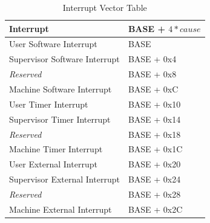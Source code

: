 \documentclass[12pt]{article}
\begin{document}
\begin{table}
\centering
\begin{tabular}{| l | l |}
\hline
Interrupt & BASE + $4*cause$ \\
\hline
User Software Interrupt & BASE \\
\hline
Supervisor Software Interrupt & BASE + 0x4 \\
\hline
\emph{Reserved} & BASE + 0x8 \\ 
\hline
Machine Software Interrupt & BASE + 0xC \\ 
\hline
User Timer Interrupt & BASE + 0x10 \\
\hline
Supervisor Timer Interrupt & BASE + 0x14 \\ 
\hline
\emph{Reserved} & BASE + 0x18 \\ 
\hline
Machine Timer Interrupt & BASE + 0x1C \\ 
\hline
User External Interrupt & BASE + 0x20 \\ 
\hline
Supervisor External Interrupt & BASE + 0x24 \\ 
\hline
\emph{Reserved} & BASE + 0x28 \\ 
\hline
Machine External Interrupt & BASE + 0x2C \\ 
\hline

\end{tabular}
\caption{Interrupt Vector Table}
\end{table}

\clearpage



\end{document}
